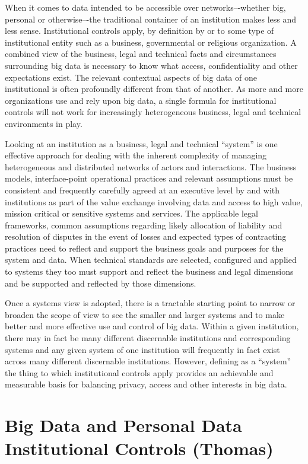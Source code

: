 When it comes to data intended to be accessible over networks–-whether big, personal or otherwise–-the traditional container of an institution makes less and less sense.
Institutional controls apply, by definition by or to some type of institutional entity such as a business, governmental or religious organization.
A combined view of the business, legal and technical facts and circumstances surrounding big data is necessary to know what access, confidentiality and other expectations exist.
The relevant contextual aspects of big data of one institutional is often profoundly different from that of another.
As more and more organizations use and rely upon big data, a single formula for institutional controls will not work for increasingly heterogeneous business, legal and technical environments in play.

Looking at an institution as a business, legal and technical “system” is one effective approach for dealing with the inherent complexity of managing heterogeneous and distributed networks of actors and interactions.
The business models, interface-point operational practices and relevant assumptions must be consistent and frequently carefully agreed at an executive level by and with institutions as part of the value exchange involving data and access to high value, mission critical or sensitive systems and services.
The applicable legal frameworks, common assumptions regarding likely allocation of liability and resolution of disputes in the event of losses and expected types of contracting practices need to reflect and support the business goals and purposes for the system and data.
When technical standards are selected, configured and applied to systems they too must support and reflect the business and legal dimensions and be supported and reflected by those dimensions.

Once a systems view is adopted, there is a tractable starting point to narrow or broaden the scope of view to see the smaller and larger systems and to make better and more effective use and control of big data.
Within a given institution, there may in fact be many different discernable institutions and corresponding systems and any given system of one institution will frequently in fact exist across many different discernable institutions. 
However, defining as a “system” the thing to which institutional controls apply provides an achievable and measurable basis for balancing privacy, access and other interests in big data.

\section{Big Data and Personal Data Institutional Controls (Thomas)}

